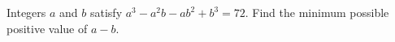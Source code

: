 Integers $a$ and $b$ satisfy $a^3-a^2b-ab^2+b^3=72$. Find the minimum possible positive value of $a-b$.
